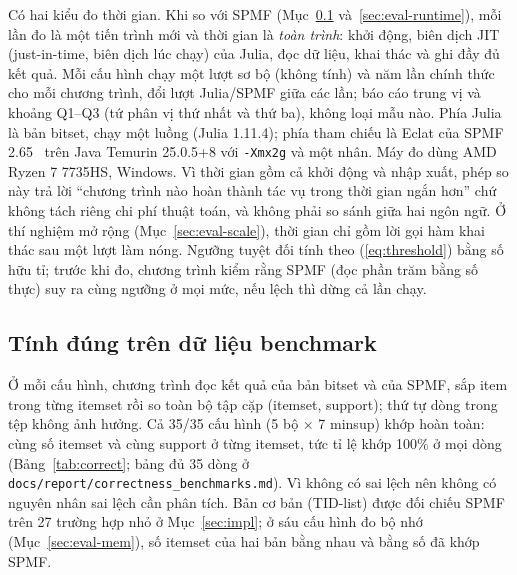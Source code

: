 Có hai kiểu đo thời gian. Khi so với SPMF (Mục~\ref{sec:eval-correct} và~\ref{sec:eval-runtime}), mỗi lần đo
là một tiến trình mới và thời gian là \emph{toàn trình}: khởi động, biên dịch JIT (just-in-time, biên dịch lúc
chạy) của Julia, đọc dữ liệu, khai thác và ghi đầy đủ kết quả. Mỗi cấu hình chạy một lượt sơ bộ (không tính) và năm lần chính thức cho mỗi
chương trình, đổi lượt Julia/SPMF giữa các lần; báo cáo trung vị và khoảng Q1--Q3 (tứ phân vị thứ nhất và thứ ba),
không loại mẫu nào. Phía
Julia là bản bitset, chạy một luồng (Julia 1.11.4); phía tham chiếu là Eclat của SPMF
2.65~\cite{fournierviger2014spmf} trên Java Temurin 25.0.5+8 với \texttt{-Xmx2g} và một nhân. Máy đo dùng
AMD Ryzen 7 7735HS, Windows. Vì thời gian gồm cả khởi động và nhập xuất, phép so này trả lời ``chương trình nào
hoàn thành tác vụ trong thời gian ngắn hơn'' chứ không tách riêng chi phí thuật toán, và không phải so sánh giữa hai ngôn ngữ.
Ở thí nghiệm mở rộng (Mục~\ref{sec:eval-scale}), thời gian chỉ gồm lời gọi hàm khai thác sau một lượt làm
nóng. Ngưỡng tuyệt đối tính theo (\ref{eq:threshold}) bằng số hữu tỉ; trước khi đo, chương trình kiểm rằng SPMF
(đọc phần trăm bằng số thực) suy ra cùng ngưỡng ở mọi mức, nếu lệch thì dừng cả lần chạy.

\subsection{Tính đúng trên dữ liệu benchmark}
\label{sec:eval-correct}

Ở mỗi cấu hình, chương trình đọc kết quả của bản bitset và của SPMF, sắp item trong từng itemset rồi so toàn bộ
tập cặp (itemset, support); thứ tự dòng trong tệp không ảnh hưởng. Cả 35/35 cấu hình (5 bộ × 7 minsup) khớp
hoàn toàn: cùng số itemset và cùng support ở từng itemset, tức tỉ lệ khớp 100\% ở mọi dòng
(Bảng~\ref{tab:correct}; bảng đủ 35 dòng ở \texttt{docs/report/correctness\_benchmarks.md}). Vì không có sai lệch
nên không có nguyên nhân sai lệch cần phân tích. Bản cơ bản (TID-list) được đối chiếu SPMF trên 27 trường hợp
nhỏ ở Mục~\ref{sec:impl}; ở sáu cấu hình đo bộ nhớ (Mục~\ref{sec:eval-mem}), số itemset của hai bản bằng nhau
và bằng số đã khớp SPMF.

